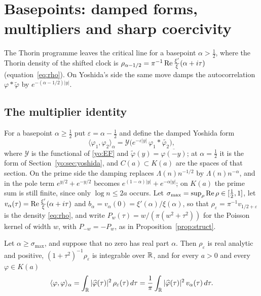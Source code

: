 \section[Damped forms and sharp coercivity]{Basepoints: damped forms, multipliers and sharp coercivity}\label{yo:sec:damped}

The Thorin programme leaves the critical line for a basepoint $\alpha>\frac12$, where the Thorin density of the shifted clock is $\rho_{\alpha-1/2}=\pi^{-1}\operatorname{Re}\frac{\xi'}\xi(\alpha+i\tau)$ (equation~\eqref{eq:rho}). On Yoshida's side the same move damps the autocorrelation $\varphi*\widetilde\varphi$ by $e^{-(\alpha-1/2)|y|}$.

\subsection{The multiplier identity}\label{yo:sec:mult}

For a basepoint $\alpha\ge\frac12$ put $\varepsilon=\alpha-\frac12$ and define the damped Yoshida form
\[
\langle\varphi_1,\varphi_2\rangle_\alpha=\mathcal Y\bigl(e^{-\varepsilon|y|}\,\varphi_1*\widetilde{\varphi_2}\bigr),
\]
where $\mathcal Y$ is the functional of \eqref{yo:EF} and $\widetilde\varphi(y)=\overline{\varphi(-y)}$; at $\alpha=\frac12$ it is the form of Section~\ref{yo:sec:yoshida}, and $C(a)\subset K(a)$ are the spaces of that section. On the prime side the damping replaces $\Lambda(n)n^{-1/2}$ by $\Lambda(n)n^{-\alpha}$, and in the pole term $e^{y/2}+e^{-y/2}$ becomes $e^{(1-\alpha)|y|}+e^{-\alpha|y|}$; on $K(a)$ the prime sum is still finite, since only $\log n\le2a$ occurs. Let $\sigma_{\max}=\sup_\rho\operatorname{Re}\rho\in[\frac12,1]$, let $v_\alpha(\tau)=\operatorname{Re}\frac{\xi'}\xi(\alpha+i\tau)$ and $b_\alpha=v_\alpha(0)=\xi'(\alpha)/\xi(\alpha)$, so that $\rho_\varepsilon=\pi^{-1}v_{1/2+\varepsilon}$ is the density \eqref{eq:rho}, and write $P_w(\tau)=w/(\pi(w^2+\tau^2))$ for the Poisson kernel of width $w$, with $P_{-w}=-P_w$, as in Proposition~\ref{prop:struct}.

\begin{proposition}\label{yo:prop:mult}
Let $\alpha\ge\sigma_{\max}$, and suppose that no zero has real part $\alpha$. Then $\rho_\varepsilon$ is real analytic and positive, $(1+\tau^2)^{-1}\rho_\varepsilon$ is integrable over $\mathbb{R}$, and for every $a>0$ and every $\varphi\in K(a)$
\[
\langle\varphi,\varphi\rangle_\alpha=\int_{\mathbb{R}}|\widehat\varphi(\tau)|^2\,\rho_\varepsilon(\tau)\,d\tau=\frac1\pi\int_{\mathbb{R}}|\widehat\varphi(\tau)|^2\,v_\alpha(\tau)\,d\tau .
\]
\end{proposition}

